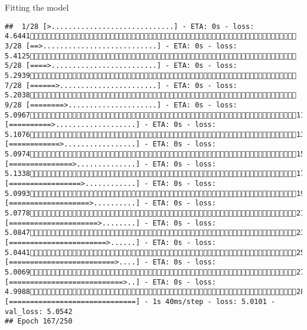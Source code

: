\documentclass[
  ignorenonframetext,
]{beamer}
\begin{document}
\begin{frame}[fragile]{Fitting the model}
\begin{verbatim}
##  1/28 [>.............................] - ETA: 0s - loss: 4.6441 3/28 [==>...........................] - ETA: 0s - loss: 5.4125 5/28 [====>.........................] - ETA: 0s - loss: 5.2939 7/28 [======>.......................] - ETA: 0s - loss: 5.2038 9/28 [========>.....................] - ETA: 0s - loss: 5.096711/28 [==========>...................] - ETA: 0s - loss: 5.107613/28 [============>.................] - ETA: 0s - loss: 5.097415/28 [===============>..............] - ETA: 0s - loss: 5.133817/28 [=================>............] - ETA: 0s - loss: 5.099319/28 [===================>..........] - ETA: 0s - loss: 5.077821/28 [=====================>........] - ETA: 0s - loss: 5.084723/28 [=======================>......] - ETA: 0s - loss: 5.044125/28 [=========================>....] - ETA: 0s - loss: 5.006927/28 [===========================>..] - ETA: 0s - loss: 4.998828/28 [==============================] - 1s 40ms/step - loss: 5.0101 - val_loss: 5.0542
## Epoch 167/250

\end{verbatim}
\end{frame}
\end{document}
